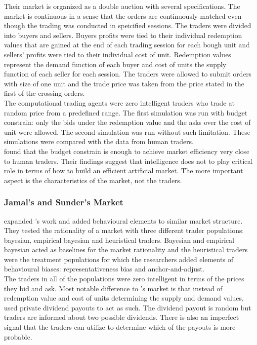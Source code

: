Their market is organized as a double auction with several
specifications. The market is continuous in a sense that the 
orders are continuously matched even though the trading was
conducted in speicified sessions. The traders were divided 
into buyers and sellers. Buyers profits were tied to their 
individual redemption values that are gained at the end of
each trading session for each bough unit and sellers' profits
were tied to their individual cost of unit. Redemption values
represent the demand function of each buyer and cost of units 
the supply function of each seller for each session. The
traders were allowed to submit orders with size of one unit
and the trade price was taken from the price stated in the 
first of the crossing orders. \\

The computational trading agents were zero intelligent traders 
who trade at random price from a predefined range. 
The first simulation was run with budget constrain: only the bids
under the redemption value and the asks over the cost of unit 
were allowed. The second simulation was run without such limitation.
These simulations were compared with the data from human traders. \\

\citeauthor{God93} found that the budget constrain is enough to 
achieve market efficiency very close to human traders. Their findings
suggest that intelligence does not to play critical role in terms of 
how to build an efficient artificial market. The more important aspect
is the characteristics of the market, not the traders.

\subsubsection{Jamal's and Sunder's Market}
\citet{Jam96} expanded \citeauthor{God93}'s work and added behavioural 
elements to similar market structure. They tested the rationality of
a market with three different trader populations: bayesian, empirical
bayesian and heuristical traders. Bayesian and empirical bayesian acted
as baselines for the market rationality and the heuristical traders were
the treatment populations for which the researchers added elements of behavioural
biases: representativeness bias and anchor-and-adjust. \\

The traders in all of the populations were zero intelligent in terms of the
prices they bid and ask. Most notable difference to \citet{God93}'s market
is that instead of redemption value and cost of units determining the
supply and demand values, \citeauthor{Jam96} used private dividend payouts 
to act as such. The dividend payout is random but traders are informed
about two possible dividends. There is also an imperfect signal that the
traders can utilize to determine which of the payouts is more probable. \\

